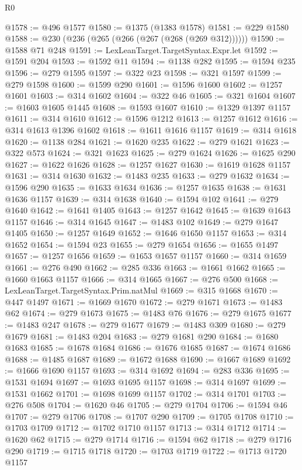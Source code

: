 \begin{lexlean}{R0}
\begin{coremodule}
@1578 := @496 @1577
@1580 := @1375 (@1383 @1578)
@1581 := @229 @1580
@1588 := @230 (@236 (@265 (@266 (@267 (@268 (@269 @312))))))
@1590 := @1588 @71 @248
@1591 := LexLeanTarget.TargetSyntax.Expr.let
@1592 := @1591 @204
@1593 := @1592 @11
@1594 := @1138 @282
@1595 := @1594 @235
@1596 := @279 @1595
@1597 := @322 @23
@1598 := @321 @1597
@1599 := @279 @1598
@1600 := @1599 @290
@1601 := @1596 @1600
@1602 := @1257 @1601
@1603 := @314 @1602
@1604 := @322 @46
@1605 := @321 @1604
@1607 := @1603 @1605 @1445
@1608 := @1593 @1607
@1610 := @1329 @1397 @1157
@1611 := @314 @1610
@1612 := @1596 @1212
@1613 := @1257 @1612
@1616 := @314 @1613 @1396 @1602
@1618 := @1611 @1616 @1157
@1619 := @314 @1618
@1620 := @1138 @284
@1621 := @1620 @235
@1622 := @279 @1621
@1623 := @322 @573
@1624 := @321 @1623
@1625 := @279 @1624
@1626 := @1625 @290
@1627 := @1622 @1626
@1628 := @1257 @1627
@1630 := @1619 @1628 @1157
@1631 := @314 @1630
@1632 := @1483 @235
@1633 := @279 @1632
@1634 := @1596 @290
@1635 := @1633 @1634
@1636 := @1257 @1635
@1638 := @1631 @1636 @1157
@1639 := @314 @1638
@1640 := @1594 @102
@1641 := @279 @1640
@1642 := @1641 @1405
@1643 := @1257 @1642
@1645 := @1639 @1643 @1157
@1646 := @314 @1645
@1647 := @1483 @102
@1649 := @279 @1647 @1405
@1650 := @1257 @1649
@1652 := @1646 @1650 @1157
@1653 := @314 @1652
@1654 := @1594 @23
@1655 := @279 @1654
@1656 := @1655 @1497
@1657 := @1257 @1656
@1659 := @1653 @1657 @1157
@1660 := @314 @1659
@1661 := @276 @490
@1662 := @285 @336
@1663 := @1661 @1662
@1665 := @1660 @1663 @1157
@1666 := @314 @1665
@1667 := @276 @500
@1668 := LexLeanTarget.TargetSyntax.Prim.natMul
@1669 := @315 @1668
@1670 := @447 @1497
@1671 := @1669 @1670
@1672 := @279 @1671
@1673 := @1483 @62
@1674 := @279 @1673
@1675 := @1483 @76
@1676 := @279 @1675
@1677 := @1483 @247
@1678 := @279 @1677
@1679 := @1483 @309
@1680 := @279 @1679
@1681 := @1483 @204
@1683 := @279 @1681 @290
@1684 := @1680 @1683
@1685 := @1678 @1684
@1686 := @1676 @1685
@1687 := @1674 @1686
@1688 := @1485 @1687
@1689 := @1672 @1688
@1690 := @1667 @1689
@1692 := @1666 @1690 @1157
@1693 := @314 @1692
@1694 := @283 @336
@1695 := @1531 @1694
@1697 := @1693 @1695 @1157
@1698 := @314 @1697
@1699 := @1531 @1662
@1701 := @1698 @1699 @1157
@1702 := @314 @1701
@1703 := @276 @508
@1704 := @1620 @46
@1705 := @279 @1704
@1706 := @1594 @46
@1707 := @279 @1706
@1708 := @1707 @290
@1709 := @1705 @1708
@1710 := @1703 @1709
@1712 := @1702 @1710 @1157
@1713 := @314 @1712
@1714 := @1620 @62
@1715 := @279 @1714
@1716 := @1594 @62
@1718 := @279 @1716 @290
@1719 := @1715 @1718
@1720 := @1703 @1719
@1722 := @1713 @1720 @1157

\end{coremodule}
\end{lexlean}

